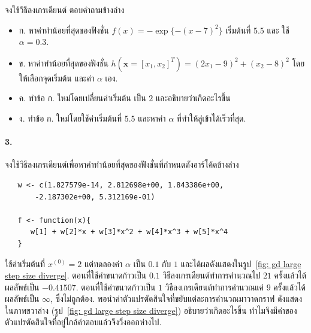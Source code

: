 จงใช้วิธีลงเกรเดียนต์ ตอบคำถามข้างล่าง
\begin{itemize}
\item ก. หาค่าทำน้อยที่สุดของฟังชั่น $f(x) = - \exp\{ - (x - 7)^2 \}$ เริ่มต้นที่ $5.5$ และ ใช้ $\alpha = 0.3$.

\item ข. หาค่าทำน้อยที่สุดของฟังชั่น $h(\mathbf{x} = [x_1, x_2]^T) = (2 x_1 - 9)^2 + (x_2 - 8)^2$ โดยให้เลือกจุดเริ่มต้น และค่า $\alpha$ เอง.

\item ค. ทำข้อ ก. ใหม่โดยเปลี่ยนค่าเริ่มต้น เป็น $2$ และอธิบายว่าเกิดอะไรขึ้น

\item ง. ทำข้อ ก. ใหม่โดยใช้ค่าเริ่มต้นที่ $5.5$ และหาค่า $\alpha$ ที่ทำให้ลู่เข้าได้เร็วที่สุด.


\end{itemize}


\paragraph{3.} จงใช้วิธีลงเกรเดียนต์เพื่อหาค่าทำน้อยที่สุดของฟังชั่นที่กำหนดดังอาร์โค้ดข้างล่าง
\begin{verbatim}
   w <- c(1.827579e-14, 2.812698e+00, 1.843386e+00,
       -2.187302e+00, 5.312169e-01)

   f <- function(x){ 
      w[1] + w[2]*x + w[3]*x^2 + w[4]*x^3 + w[5]*x^4
   }
\end{verbatim}
ใช้ค่าเริ่มต้นที่ $x^{(0)} = 2$ แต่ทดลองค่า $\alpha$ เป็น $0.1$ กับ $1$ และได้ผลดังแสดงในรูป~\ref{fig: gd large step size diverge}.
ตอนที่ใช้ค่าขนาดก้าวเป็น $0.1$ วิธีลงเกรเดียนต์ทำการคำนวณไป $21$ ครั้งแล้วได้ผลลัพธ์เป็น $-0.41507$.
ตอนที่ใช้ค่าขนาดก้าวเป็น $1$ วิธีลงเกรเดียนต์ทำการคำนวณแค่ $9$ ครั้งแล้วได้ผลลัพธ์เป็น $\infty$, ซึ่งไม่ถูกต้อง.
พอนำค่าตัวแปรตัดสินใจที่ขยับแต่ละการคำนวณมาวาดกราฟ ดังแสดงในภาพขวาล่าง (รูป~\ref{fig: gd large step size diverge}) 
อธิบายว่าเกิดอะไรขึ้น ทำไมจึงมีค่าของตัวแปรตัดสินใจที่อยู่ใกล้คำตอบแล้วจึงวิ่งออกห่างไป.

